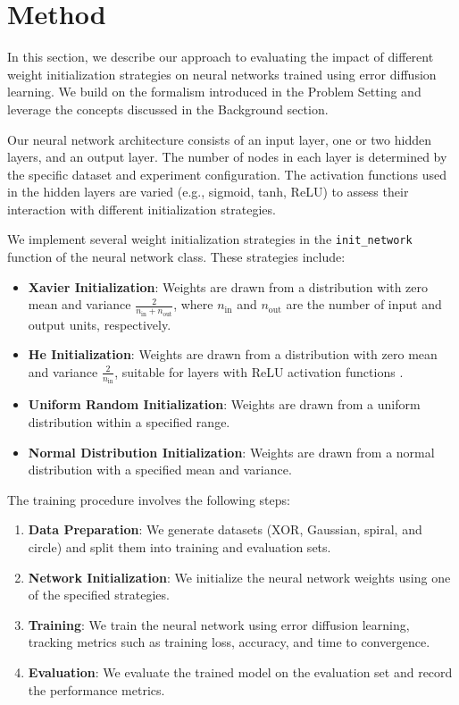\documentclass{article} %
\begin{document}
\section{Method}
\label{sec:method}

In this section, we describe our approach to evaluating the impact of different weight initialization strategies on neural networks trained using error diffusion learning. We build on the formalism introduced in the Problem Setting and leverage the concepts discussed in the Background section.

Our neural network architecture consists of an input layer, one or two hidden layers, and an output layer. The number of nodes in each layer is determined by the specific dataset and experiment configuration. The activation functions used in the hidden layers are varied (e.g., sigmoid, tanh, ReLU) to assess their interaction with different initialization strategies.

We implement several weight initialization strategies in the \texttt{init\_network} function of the neural network class. These strategies include:
\begin{itemize}
    \item \textbf{Xavier Initialization}: Weights are drawn from a distribution with zero mean and variance \( \frac{2}{n_{\text{in}} + n_{\text{out}}} \), where \( n_{\text{in}} \) and \( n_{\text{out}} \) are the number of input and output units, respectively.
    \item \textbf{He Initialization}: Weights are drawn from a distribution with zero mean and variance \( \frac{2}{n_{\text{in}}} \), suitable for layers with ReLU activation functions \citep{he2015delving}.
    \item \textbf{Uniform Random Initialization}: Weights are drawn from a uniform distribution within a specified range.
    \item \textbf{Normal Distribution Initialization}: Weights are drawn from a normal distribution with a specified mean and variance.
\end{itemize}

The training procedure involves the following steps:
\begin{enumerate}
    \item \textbf{Data Preparation}: We generate datasets (XOR, Gaussian, spiral, and circle) and split them into training and evaluation sets.
    \item \textbf{Network Initialization}: We initialize the neural network weights using one of the specified strategies.
    \item \textbf{Training}: We train the neural network using error diffusion learning, tracking metrics such as training loss, accuracy, and time to convergence.
    \item \textbf{Evaluation}: We evaluate the trained model on the evaluation set and record the performance metrics.
\end{enumerate}
\end{document}
